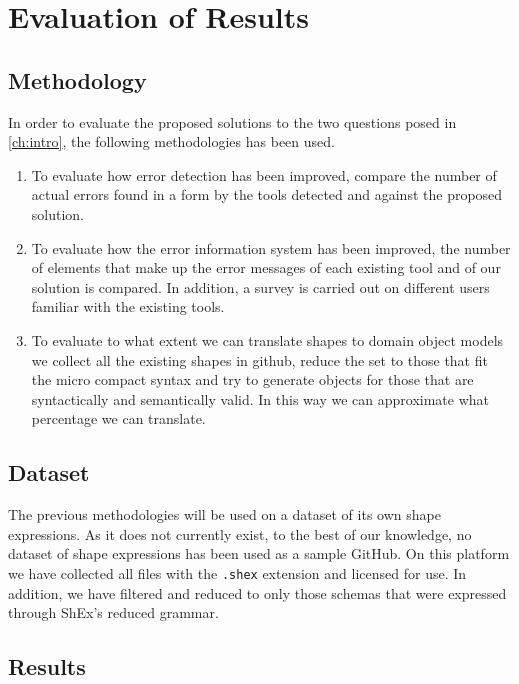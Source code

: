 \chapter{Evaluation of Results}
\label{ch:results-evaluation}

\section{Methodology}
In order to evaluate the proposed solutions to the two questions posed in \cref{ch:intro},
the following methodologies has been used.

\begin{enumerate}
    \item To evaluate how error detection has been improved, compare the number of actual errors found
    in a form by the tools detected and against the proposed solution.
    
    \item To evaluate how the error information system has been improved, the number of elements that
    make up the error messages of each existing tool and of our solution is compared. In addition,
    a survey is carried out on different users familiar with the existing tools.

    \item To evaluate to what extent we can translate shapes to domain object models we collect all the
    existing shapes in github, reduce the set to those that fit the micro compact syntax and try to
    generate objects for those that are syntactically and semantically valid. In this way we can
    approximate what percentage we can translate.
\end{enumerate}

\section{Dataset}
The previous methodologies will be used on a dataset of its own shape expressions. As it does not currently
exist, to the best of our knowledge, no dataset of shape expressions has been used as a sample GitHub.
On this platform we have collected all files with the \texttt{.shex} extension and licensed for use. In addition,
we have filtered and reduced to only those schemas that were expressed through ShEx's reduced grammar.

\section{Results}

